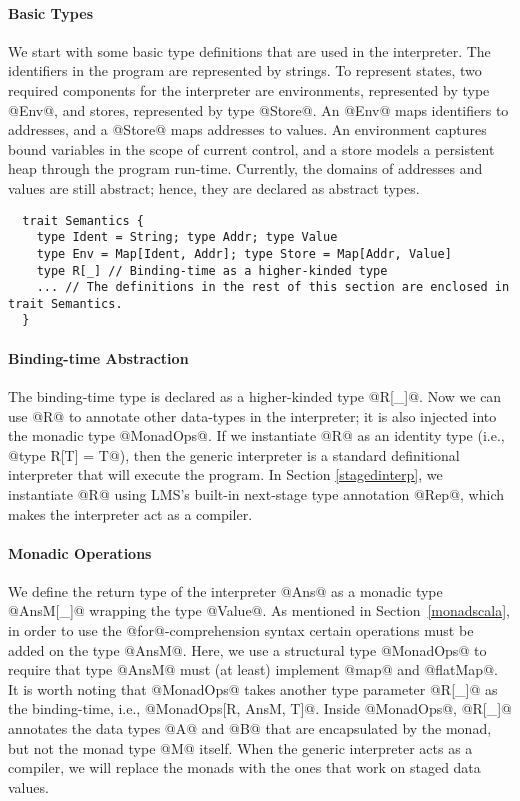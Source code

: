 \paragraph{Basic Types} We start with some basic type definitions that are used
in the interpreter. The identifiers in the program are represented by strings.
To represent states, two required components for the interpreter are
environments, represented by type @Env@, and stores, represented by type
@Store@. An @Env@ maps identifiers to addresses, and a @Store@ maps addresses to
values. An environment captures bound variables in the scope of current control, and
a store models a persistent heap through the program run-time.  Currently,
the domains of addresses and values are still abstract; hence, they are
declared as abstract types.
\begin{lstlisting}
  trait Semantics {
    type Ident = String; type Addr; type Value
    type Env = Map[Ident, Addr]; type Store = Map[Addr, Value]
    type R[_] // Binding-time as a higher-kinded type
    ... // The definitions in the rest of this section are enclosed in trait Semantics.
  }
\end{lstlisting}

\paragraph{Binding-time Abstraction}
The binding-time type is declared as a higher-kinded type @R[_]@.
Now we can use @R@ to annotate other data-types in the interpreter;
it is also injected into the monadic type @MonadOps@.  If we instantiate
@R@ as an identity type (i.e., @type R[T] = T@), then the generic interpreter is a
standard definitional interpreter that will execute the program.  In Section
\ref{stagedinterp}, we instantiate @R@ using LMS's built-in next-stage
type annotation @Rep@, which makes the interpreter act as a compiler.

\paragraph{Monadic Operations} We define the return type of the interpreter
@Ans@ as a monadic type @AnsM[_]@ wrapping the type @Value@.
As mentioned in Section~\ref{monadscala}, in order to use the @for@-comprehension
syntax certain operations must be added on the type @AnsM@. Here, we use a
structural type @MonadOps@ to require that type @AnsM@ must (at least)
implement @map@ and @flatMap@. It is worth noting that @MonadOps@ takes another
type parameter @R[_]@ as the binding-time, i.e., @MonadOps[R, AnsM, T]@.
Inside @MonadOps@, @R[_]@ annotates the data types @A@ and @B@ that are
encapsulated by the monad, but not the monad type @M@ itself. When the generic
interpreter acts as a compiler, we will replace the monads with the ones that
work on staged data values.

